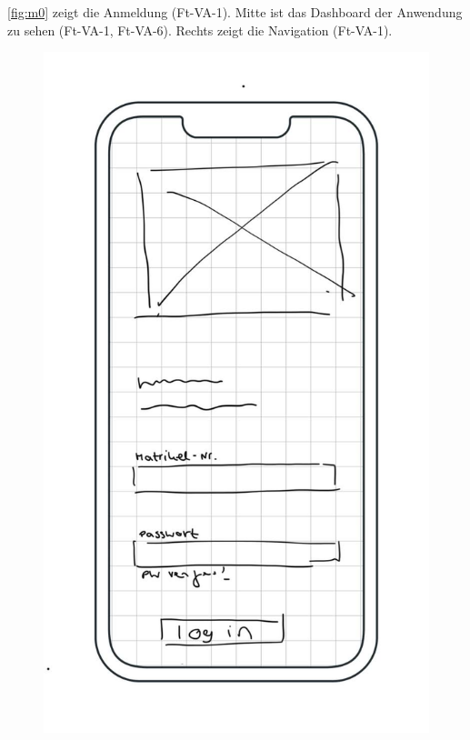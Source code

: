 \ref{fig:m0} zeigt die Anmeldung (Ft-VA-1). Mitte ist das Dashboard der Anwendung
zu sehen (Ft-VA-1, Ft-VA-6). Rechts zeigt die Navigation (Ft-VA-1).

\begin{figure}[h]
    \centering
    \includegraphics[scale=0.37]{Bilder/Mockups/Login.jpg}

\end{figure}
